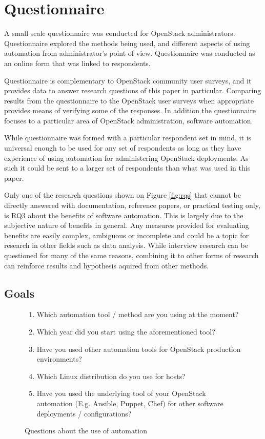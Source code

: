 \chapter{Questionnaire} \label{questionnaire}

A small scale questionnaire was conducted for OpenStack administrators.
Questionnaire explored the methods being used, and different aspects of using
automation from administrator's point of view. Questionnaire was conducted as
an online form that was linked to respondents.

Questionnaire is complementary to OpenStack community user surveys, and it
provides data to answer research questions of this paper in particular.
Comparing results from the questionnaire to the OpenStack user surveys when
appropriate provides means of verifying some of the responses. In addition the
questionnaire focuses to a particular area of OpenStack administration,
software automation.

While questionnaire was formed with a particular respondent set in mind, it is
universal enough to be used for any set of respondents as long as they have
experience of using automation for administering OpenStack deployments. As such
it could be sent to a larger set of respondents than what was used in this
paper.

Only one of the research questions shown on Figure \ref{fig:rqs} that cannot be
directly answered with documentation, reference papers, or practical testing
only, is RQ3 about the benefits of software automation. This is largely due to
the subjective nature of benefits in general. Any measures provided for
evaluating benefits are easily complex, ambiguous or incomplete and could be a
topic for research in other fields such as data analysis. While interview
research can be questioned for many of the same reasons, combining it to other
forms of research can reinforce results and hypothesis aquired from other
methods.

\section{Goals}

\begin{figure}[t]
\centering
\begin{enumerate}
  \itemsep0em
  \item Which automation tool / method are you using at the moment?
  \item Which year did you start using the aforementioned tool?
  \item Have you used other automation tools for OpenStack production
        environments?
  \item Which Linux distribution do you use for hosts?
  \item Have you used the underlying tool of your OpenStack automation (E.g.
        Ansible, Puppet, Chef) for other software deployments / configurations?
\end{enumerate}
\caption{Questions about the use of automation}
\label{fig:questionnaire-tool-details}
\end{figure}

